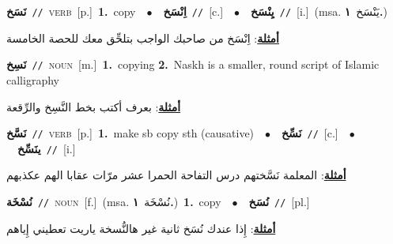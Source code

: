\documentclass[10pt,a4paper,twoside]{article} %
\begin{document}
\begin{multicols}{2}
{\setlength\topsep{0pt}\textbf{\foreignlanguage{arabic}{نَسَخ}}\ {\color{gray}\texttt{//}\color{black}}\ \textsc{verb}\ [p.]\ \textbf{1.}~copy\ \ $\bullet$\ \ \setlength\topsep{0pt}\textbf{\foreignlanguage{arabic}{اِنْسَخ}}\ {\color{gray}\texttt{//}\color{black}}\ [c.]\ \ $\bullet$\ \ \setlength\topsep{0pt}\textbf{\foreignlanguage{arabic}{يِنْسَخ}}\ {\color{gray}\texttt{//}\color{black}}\ [i.]\ \color{gray}(msa. \foreignlanguage{arabic}{يَنْسَخ}~\foreignlanguage{arabic}{\textbf{١.}})\color{black}\  \begin{flushright}\color{gray}\foreignlanguage{arabic}{\textbf{\underline{\foreignlanguage{arabic}{أمثلة}}}: اِنْسَخ من صاحبك الواجب بتلحِّق معك للحصة الخامسة}\end{flushright}\color{black}} \vspace{2mm}

{\setlength\topsep{0pt}\textbf{\foreignlanguage{arabic}{نَسِخ}}\ {\color{gray}\texttt{//}\color{black}}\ \textsc{noun}\ [m.]\ \textbf{1.}~copying  \textbf{2.}~Naskh is a smaller, round script of Islamic calligraphy\  \begin{flushright}\color{gray}\foreignlanguage{arabic}{\textbf{\underline{\foreignlanguage{arabic}{أمثلة}}}: بعرف أكتب بخط النَّسِخ والرِّقعة}\end{flushright}\color{black}} \vspace{2mm}

{\setlength\topsep{0pt}\textbf{\foreignlanguage{arabic}{نَسَّخ}}\ {\color{gray}\texttt{//}\color{black}}\ \textsc{verb}\ [p.]\ \textbf{1.}~make sb copy sth (causative)\ \ $\bullet$\ \ \setlength\topsep{0pt}\textbf{\foreignlanguage{arabic}{نَسِّخ}}\ {\color{gray}\texttt{//}\color{black}}\ [c.]\ \ $\bullet$\ \ \setlength\topsep{0pt}\textbf{\foreignlanguage{arabic}{ينَسِّخ}}\ {\color{gray}\texttt{//}\color{black}}\ [i.]\  \begin{flushright}\color{gray}\foreignlanguage{arabic}{\textbf{\underline{\foreignlanguage{arabic}{أمثلة}}}: المعلمة نَسَّختهم درس التفاحة الحمرا عشر مرّات عقابا الهم عكذبهم}\end{flushright}\color{black}} \vspace{2mm}

{\setlength\topsep{0pt}\textbf{\foreignlanguage{arabic}{نُسْخَة}}\ {\color{gray}\texttt{//}\color{black}}\ \textsc{noun}\ [f.]\ \color{gray}(msa. \foreignlanguage{arabic}{نُسْخَة}~\foreignlanguage{arabic}{\textbf{١.}})\color{black}\ \textbf{1.}~copy\ \ $\bullet$\ \ \setlength\topsep{0pt}\textbf{\foreignlanguage{arabic}{نُسَخ}}\ {\color{gray}\texttt{//}\color{black}}\ [pl.]\  \begin{flushright}\color{gray}\foreignlanguage{arabic}{\textbf{\underline{\foreignlanguage{arabic}{أمثلة}}}: إِذا عندك نُسَخ ثانية غير هالنُّسخة ياريت تعطيني إِياهم}\end{flushright}\color{black}} \vspace{2mm}


\end{multicols}
\end{document}
